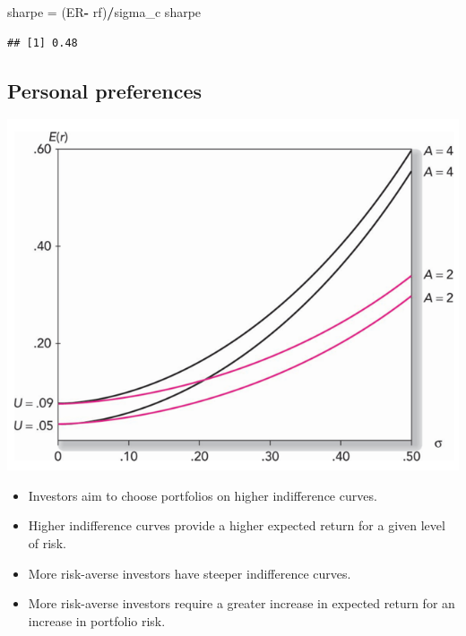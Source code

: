 \documentclass[
]{book}
\newenvironment{Shaded}{\begin{snugshade}}{\end{snugshade}}
\newcommand{\NormalTok}[1]{#1}
\newcommand{\OtherTok}[1]{\textcolor[rgb]{0.56,0.35,0.01}{#1}}
\newcommand{\SpecialCharTok}[1]{\textcolor[rgb]{0.81,0.36,0.00}{\textbf{#1}}}
\providecommand{\tightlist}{%
  \setlength{\itemsep}{0pt}\setlength{\parskip}{0pt}}
\begin{document}
\begin{Shaded}
\begin{Highlighting}[]
\NormalTok{sharpe }\OtherTok{=}\NormalTok{ (ER}\SpecialCharTok{{-}}\NormalTok{ rf)}\SpecialCharTok{/}\NormalTok{sigma\_c}
\NormalTok{sharpe}
\end{Highlighting}
\end{Shaded}

\begin{verbatim}
## [1] 0.48
\end{verbatim}

\hypertarget{personal-preferences}{%
\subsection{Personal preferences}\label{personal-preferences}}

\includegraphics{Resources/capaloocation3.png}

\begin{itemize}
\tightlist
\item
  Investors aim to choose portfolios on higher indifference curves.
\item
  Higher indifference curves provide a higher expected return for a
  given level of risk.
\item
  More risk-averse investors have steeper indifference curves.
\item
  More risk-averse investors require a greater increase in expected
  return for an increase in portfolio risk.
\end{itemize}
\end{document}

